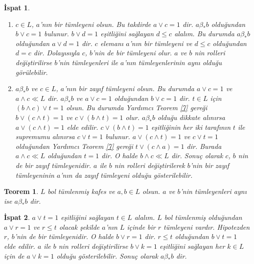 \documentclass[a4paper,12pt]{article}
\numberwithin{equation}{section}
\theoremstyle{italik}
\newtheorem{teorem}{Teorem}[section]
\newtheorem*{ispat}{İspat}
\begin{document}
\begin{ispat}
  \begin{enumerate}
    \item
      $ c \in L $, $ a $'nın bir tümleyeni olsun. Bu takdirde $ a \vee c = 1 $ dir. $ a \beta_* b $ olduğundan $ b \vee c = 1 $ bulunur. 
      $ b \vee d = 1 $ eşitliğini sağlayan $ d \leq c $ alalım. Bu durumda $ a \beta_* b $ olduğundan $ a \vee d = 1 $ dir. 
      $ c $ elemanı $ a $'nın bir tümleyeni ve $ d \leq c $ olduğundan $ d=c $ dir. Dolayısıyla $ c $, $ b $'nin de bir tümleyeni olur. 
      $ a $ ve $ b $ nin rolleri değiştirilirse $ b $'nin tümleyenleri ile $ a $'nın tümleyenlerinin aynı 
      olduğu görülebilir.
    \item
      $ a \beta_* b $ ve $ c \in L $, $ a $'nın bir zayıf tümleyeni olsun. Bu durumda $ a \vee c = 1 $ ve 
      $ a \wedge c \ll L $ dir. $ a \beta_* b $ ve $ a \vee c = 1 $ olduğundan $ b \vee c = 1 $ dir. 
      $ t \in L $ için $ ( b \wedge c ) \vee t = 1 $ olsun. Bu durumda Yardımcı Teorem \ref{7}
      gereği $ b \vee ( c \wedge t ) = 1 $ ve $ c \vee ( b \wedge t ) = 1 $ olur. $ a \beta_* b $ olduğu dikkate alınırsa 
      $ a \vee (c \wedge t)=1 $ elde edilir. $ c \vee (b \wedge t)=1 $ eşitliğinin her iki 
      tarafının $ t $ ile supremumu alınırsa $ c \vee t = 1 $ bulunur. $ a \vee (c \wedge t)=1 $ ve 
      $ c \vee t = 1 $ olduğundan Yardımcı Teorem \ref{7} gereği $ t \vee (c \wedge a)=1 $ dir. 
      Burada $ a \wedge c \ll L $ olduğundan $ t = 1 $ dir. 
      O halde $ b \wedge c \ll L $ dir. Sonuç olarak $ c $, $ b $ nin de bir zayıf tümleyenidir. $ a $ ile $ b $ nin 
      rolleri değiştirilerek $ b $'nin bir zayıf tümleyeninin $ a $'nın da zayıf tümleyeni olduğu gösterilebilir.
  \end{enumerate}
\end{ispat}


\begin{teorem}\label{9}
  $ L $ bol tümlenmiş kafes ve $ a,b \in L $ olsun. $ a $ ve $ b $'nin 
  tümleyenleri aynı ise $ a \beta_* b $ dir.
\end{teorem}
\begin{ispat}
  $ a \vee t=1 $ eşitliğini sağlayan $ t \in L $ alalım. $ L $ bol tümlenmiş olduğundan $ a \vee r = 1 $ ve 
  $ r \leq t $ olacak şekilde $ a $'nın $ L $ içinde bir $ r $ tümleyeni vardır. Hipotezden $ r $, 
  $ b $'nin de bir tümleyenidir. O halde $ b \vee r = 1 $ dir. $ r \leq t $ olduğundan 
  $ b \vee t = 1 $ elde edilir. $ a $ ile $ b $ nin rolleri değiştirilirse $ b \vee k = 1 $ 
  eşitliğini sağlayan her $ k \in L $ için de $ a \vee k = 1 $ olduğu gösterilebilir. 
  Sonuç olarak $ a \beta_* b $ dir.
\end{ispat}
\end{document}
